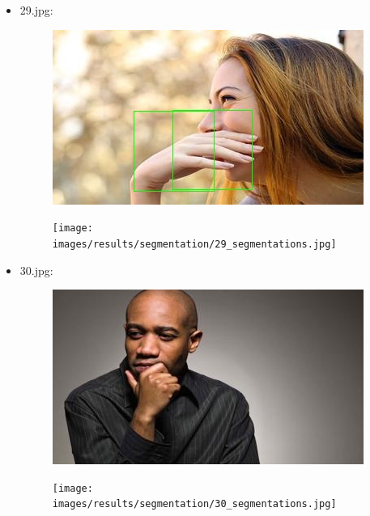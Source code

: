 \begin{itemize}
\begin{figure}[!htb]
\begin{minipage}{0.5\textwidth}
            \end{minipage}
        \end{figure}
    \item 29.jpg:
        \begin{figure}[!htb]
            \begin{minipage}{0.5\textwidth}
                \centering
                \includegraphics[scale = 0.68]{images/results/detection/29_detections.jpg}
            \end{minipage}\hfill
            \begin{minipage}{0.5\textwidth}
                \centering
                \texttt{[image: images/results/segmentation/29\_segmentations.jpg]}
            \end{minipage}
        \end{figure}
    \newpage
     \item 30.jpg:
        \begin{figure}[!htb]
            \begin{minipage}{0.5\textwidth}
                \centering
                \includegraphics[scale = 0.68]{images/results/detection/30_detections.jpg}
            \end{minipage}\hfill
            \begin{minipage}{0.5\textwidth}
                \centering
                \texttt{[image: images/results/segmentation/30\_segmentations.jpg]}
            \end{minipage}
        \end{figure}
\end{itemize} 
\fi

